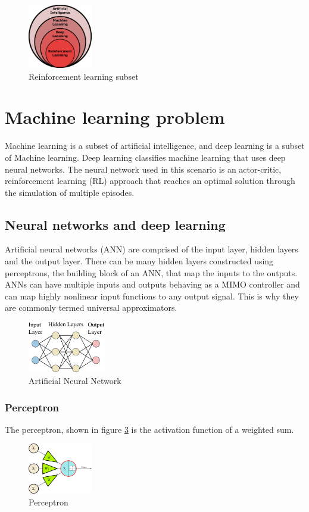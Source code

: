 \begin{figure}
\centering
\includegraphics[width= 0.25\textwidth]{figures/AI Subsets.png}
\caption{Reinforcement learning subset}
\label{fig:sub}
\end{figure}

\section{Machine learning problem}
Machine learning is a subset of artificial intelligence, and deep learning is a subset of Machine learning. Deep learning classifies machine learning that uses deep neural networks. The neural network used in this scenario is an actor-critic, reinforcement learning (RL) approach
that reaches an optimal solution through the simulation of multiple episodes.\cite{rl2}

\subsection{Neural networks and deep learning}

  Artificial neural networks (ANN) are comprised of the input layer, hidden layers and the output layer. There can be many hidden layers constructed using perceptrons, the building block of an ANN, that map the inputs to the outputs. ANNs can have multiple inputs and outputs behaving as a MIMO controller and can map highly nonlinear input functions to any output signal. This is why they are commonly termed universal approximators.
\begin{figure}[h]
\centering
\includegraphics[width= 0.3\textwidth]{figures/NeuralNetwork.png}
\caption{Artificial Neural Network}
\label{fig:neu}
\end{figure}

\subsubsection{Perceptron}
The perceptron, shown in figure \ref{fig:per} is the activation function of a weighted sum.
\begin{figure}[h]
\centering
\includegraphics[width= 0.25\textwidth]{figures/Perceptron.png}
\caption{Perceptron}
\label{fig:per}
\end{figure}


